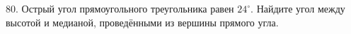80. Острый угол прямоугольного треугольника равен $24^\circ.$ Найдите угол между высотой и медианой, проведёнными из вершины прямого угла.\\
